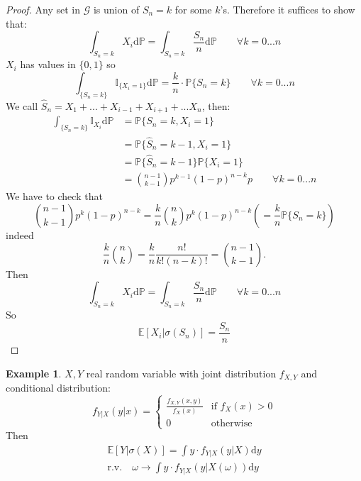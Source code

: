\documentclass[10pt,a4paper]{article}
\theoremstyle{definition}
\newtheorem{exi}{Example}[section]
\begin{document}
\begin{proof}
Any set in $\mathcal{G}$ is union of $ {S_n=k} $ for some $ k $'s. Therefore it suffices to show that:
\begin{equation*}
	\int_{{S_n=k}}X_i\mathrm{d}\mathbb{P} = \int_{{S_n=k}}\frac{S_n}{n}\mathrm{d}\mathbb{P}  \qquad    \forall k=0...n
\end{equation*}
$ X_i  $ has values in $ \{0,1\} $ so
\begin{equation*}
	\int_{\{S_n=k\}}\mathbb{I}_{\{X_i=1\}}\mathrm{d}\mathbb{P} = \frac{k}{n}\cdot\mathbb{P}\{S_n=k\}   \qquad   \forall k=0...n
\end{equation*}
We call $\hat{S}_n=X_1+...+X_{i-1}+X_{i+1}+...X_n$, then:
\begin{equation*}
	\begin{split}
	\int_{\{S_n=k\}}\mathbb{I}_{X_i}\mathrm{d}\mathbb{P} & = \mathbb{P}\{S_n=k,X_i=1\}\\
	&=\mathbb{P}\{\hat{S}_n=k-1,X_i=1\}\\
	&=\mathbb{P}\{\hat{S}_n=k-1\}\mathbb{P}\{X_i=1\}\\
	  & =\binom{n-1}{k-1}p^{k-1}(1-p)^{n-k}p 
	  \qquad\forall k=0...n
   \end{split}
\end{equation*}
We have to check that
\begin{equation*}
	\binom{n-1}{k-1}p^{k}(1-p)^{n-k}=\frac{k}{n}\binom{n}{k}p^{k}(1-p)^{n-k}\left(=\frac{k}{n}\mathbb{P}\{S_n=k\}\right)
\end{equation*}
indeed
\begin{equation*}
	\frac{k}{n}\binom{n}{k}=\frac{k}{n}\frac{n!}{k!(n-k)!}=\binom{n-1}{k-1}.
\end{equation*}
Then
\begin{equation*}
	\int_{{S_n=k}}X_i\mathrm{d}\mathbb{P} = \int_{{S_n=k}}\frac{S_n}{n}\mathrm{d}\mathbb{P}  \qquad    \forall k=0...n
\end{equation*}
So
\begin{equation*}
	\mathbb{E}[X_i|\sigma(S_n)]=\frac{S_n}{n}
\end{equation*}

\end{proof}
	\begin{exi}
		$ X,Y $ real random variable with joint distribution $ f_{X,Y} $ and conditional distribution:
		\begin{equation*}
			f_{Y|X}(y|x)=
			\begin{cases}
				\frac{f_{X,Y}(x,y)}{f_X(x)}   &\text{if } f_X(x)>0 \\
				0 & \text{otherwise}
			\end{cases}
		\end{equation*}
	Then
	\begin{equation*}
		\begin{split}
			\mathbb{E}[Y|\sigma(X)]=\int y \cdot f_{Y|X}(y|X)\mathrm{d}y \\
			\mathrm{r.v.} \quad \omega\to\int y\cdot f_{Y|X}(y|X(\omega))\mathrm{d}y
		\end{split}	
	\end{equation*}
	\end{exi}
\end{document}
